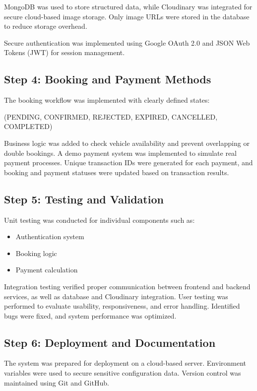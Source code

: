 \documentclass[12pt,a4paper]{report}
\begin{document}
MongoDB\cite{mongodb} was used to store structured data, while Cloudinary\cite{cloudinary} was integrated for secure cloud-based image storage. Only image URLs were stored in the database to reduce storage overhead.

Secure authentication was implemented using Google OAuth 2.0\cite{oauth} and JSON Web Tokens (JWT)\cite{jwt} for session management.

\subsection{Step 4: Booking and Payment Methods}

The booking workflow was implemented with clearly defined states:
\begin{itemize}
	 (PENDING, CONFIRMED, REJECTED, EXPIRED, CANCELLED,
COMPLETED)
\end{itemize}

Business logic was added to check vehicle availability and prevent overlapping or double bookings. A demo payment system was implemented to simulate real payment processes. Unique transaction IDs were generated for each payment, and booking and payment statuses were updated based on transaction results.

\subsection{Step 5: Testing and Validation}

Unit testing was conducted for individual components such as:
\begin{itemize}
	\item Authentication system
	\item Booking logic
	\item Payment calculation
\end{itemize}

Integration testing verified proper communication between frontend and backend services, as well as database and Cloudinary integration. User testing was performed to evaluate usability, responsiveness, and error handling. Identified bugs were fixed, and system performance was optimized.

\subsection{Step 6: Deployment and Documentation}

The system was prepared for deployment on a cloud-based server. Environment variables were used to secure sensitive configuration data. Version control was maintained using Git and GitHub.
\end{document}
